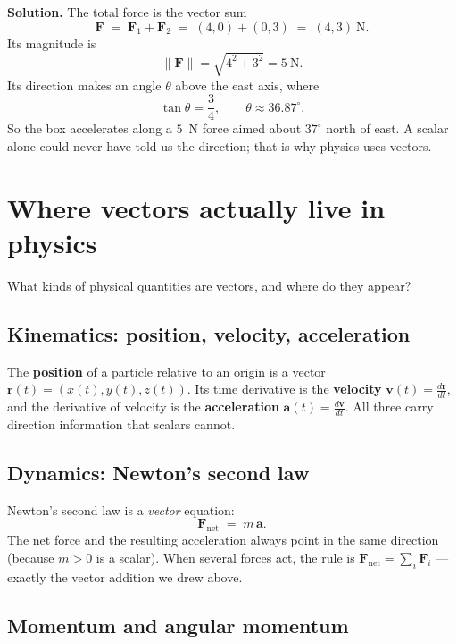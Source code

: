 \documentclass[11pt,a4paper]{article}
\newcommand{\vect}[1]{\boldsymbol{#1}}
\begin{document}
\textbf{Solution.}
The total force is the vector sum
\[
  \vect{F} \;=\; \vect{F}_1 + \vect{F}_2 \;=\; (4,0) + (0,3) \;=\; (4,3)~\text{N}.
\]
Its magnitude is
\[
  \lVert \vect{F} \rVert = \sqrt{4^2 + 3^2} = 5~\text{N}.
\]
Its direction makes an angle $\theta$ above the east axis, where
\[
  \tan\theta = \frac{3}{4}, \qquad \theta \approx 36.87^\circ.
\]
So the box accelerates along a $5$~N force aimed about $37^\circ$ north of east.
A scalar alone could never have told us the direction; that is why physics uses vectors.

\section{Where vectors actually live in physics}

\begin{problemblock}
What kinds of physical quantities are vectors, and where do they appear?
\end{problemblock}

\subsection*{Kinematics: position, velocity, acceleration}

\begin{solutionblock}
The \textbf{position} of a particle relative to an origin is a vector
$\vect{r}(t) = (x(t), y(t), z(t))$.
Its time derivative is the \textbf{velocity}
$\vect{v}(t) = \tfrac{d\vect{r}}{dt}$,
and the derivative of velocity is the \textbf{acceleration}
$\vect{a}(t) = \tfrac{d\vect{v}}{dt}$.
All three carry direction information that scalars cannot.
\end{solutionblock}

\subsection*{Dynamics: Newton's second law}

\begin{solutionblock}
Newton's second law is a \emph{vector} equation:
\[
  \vect{F}_{\text{net}} \;=\; m\,\vect{a}.
\]
The net force and the resulting acceleration always point in the same direction
(because $m > 0$ is a scalar). When several forces act, the rule is
$\vect{F}_{\text{net}} = \sum_i \vect{F}_i$ --- exactly the vector addition we drew above.
\end{solutionblock}

\subsection*{Momentum and angular momentum}
\end{document}
